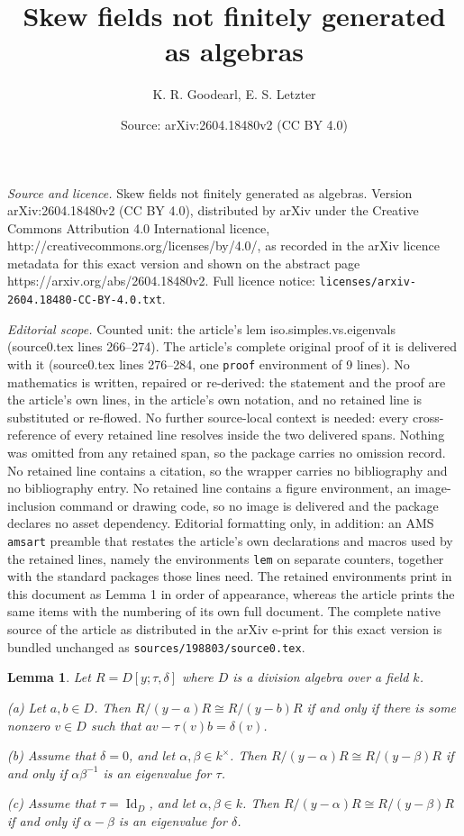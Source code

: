 \documentclass[10pt,a4paper]{amsart}
\title{Skew fields not finitely generated as algebras}
\author{K. R. Goodearl, E. S. Letzter}
\date{Source: arXiv:2604.18480v2 (CC BY 4.0)}
\newtheorem{lem}{Lemma}
\DeclareMathOperator{\Id}{Id}
\newcommand{\kx}{k^\times}
\begin{document}
\maketitle

\noindent\emph{Source and licence.} Skew fields not finitely generated as algebras. Version arXiv:2604.18480v2 (CC BY 4.0), distributed by arXiv under the Creative Commons Attribution 4.0 International licence, http://creativecommons.org/licenses/by/4.0/, as recorded in the arXiv licence metadata for this exact version and shown on the abstract page https://arxiv.org/abs/2604.18480v2. Full licence notice: \texttt{licenses/arxiv-2604.18480-CC-BY-4.0.txt}.\par\smallskip

\noindent\textit{Editorial scope.} Counted unit: the article's lem iso.simples.vs.eigenvals (source0.tex lines 266--274). The article's complete original proof of it is delivered with it (source0.tex lines 276--284, one \texttt{proof} environment of 9 lines). No mathematics is written, repaired or re-derived: the statement and the proof are the article's own lines, in the article's own notation, and no retained line is substituted or re-flowed.  No further source-local context is needed: every cross-reference of every retained line resolves inside the two delivered spans.  Nothing was omitted from any retained span, so the package carries no omission record.  No retained line contains a citation, so the wrapper carries no bibliography and no bibliography entry.  No retained line contains a figure environment, an image-inclusion command or drawing code, so no image is delivered and the package declares no asset dependency.  Editorial formatting only, in addition: an AMS \texttt{amsart} preamble that restates the article's own declarations and macros used by the retained lines, namely the environments \texttt{lem} on separate counters, together with the standard packages those lines need.  The retained environments print in this document as Lemma 1 in order of appearance, whereas the article prints the same items with the numbering of its own full document.  The complete native source of the article as distributed in the arXiv e-print for this exact version is bundled unchanged as \texttt{sources/198803/source0.tex}.
\begin{lem}  \label{iso.simples.vs.eigenvals}
Let $R = D[y;\tau,\delta]$ where $D$ is a division algebra over a field $k$.

{\rm(a)} Let $a,b \in D$.  Then $R/(y-a)R \cong R/(y-b)R$ if and only if there is some nonzero $v\in D$ such that $av-\tau(v)b = \delta(v)$.

{\rm(b)} Assume that $\delta = 0$, and let $\alpha,\beta \in \kx$.  Then $R/(y-\alpha)R \cong R/(y-\beta)R$ if and only if $\alpha\beta^{-1}$ is an eigenvalue for $\tau$.

{\rm(c)} Assume that $\tau = \Id_D$, and let $\alpha,\beta \in k$. Then $R/(y-\alpha)R \cong R/(y-\beta)R$ if and only if $\alpha - \beta$ is an eigenvalue for $\delta$.
\end{lem}
\end{document}
